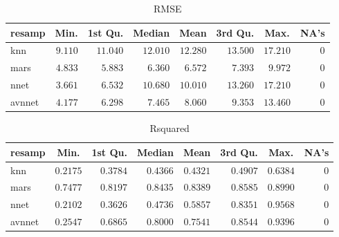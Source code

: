\begin{table}[!tbp]
\caption{RMSE\label{RMSE}} 
\begin{center}
\begin{tabular}{lrrrrrrr}
\hline\hline
\multicolumn{1}{l}{resamp}&\multicolumn{1}{c}{Min.}&\multicolumn{1}{c}{1st Qu.}&\multicolumn{1}{c}{Median}&\multicolumn{1}{c}{Mean}&\multicolumn{1}{c}{3rd Qu.}&\multicolumn{1}{c}{Max.}&\multicolumn{1}{c}{NA's}\tabularnewline
\hline
knn&$9.110$&$11.040$&$12.010$&$12.280$&$13.500$&$17.210$&$0$\tabularnewline
mars&$4.833$&$ 5.883$&$ 6.360$&$ 6.572$&$ 7.393$&$ 9.972$&$0$\tabularnewline
nnet&$3.661$&$ 6.532$&$10.680$&$10.010$&$13.260$&$17.210$&$0$\tabularnewline
avnnet&$4.177$&$ 6.298$&$ 7.465$&$ 8.060$&$ 9.353$&$13.460$&$0$\tabularnewline
\hline
\end{tabular}\end{center}

\end{table}
\begin{table}[!tbp]
\caption{Rsquared\label{Rsquared}} 
\begin{center}
\begin{tabular}{lrrrrrrr}
\hline\hline
\multicolumn{1}{l}{resamp}&\multicolumn{1}{c}{Min.}&\multicolumn{1}{c}{1st Qu.}&\multicolumn{1}{c}{Median}&\multicolumn{1}{c}{Mean}&\multicolumn{1}{c}{3rd Qu.}&\multicolumn{1}{c}{Max.}&\multicolumn{1}{c}{NA's}\tabularnewline
\hline
knn&$0.2175$&$0.3784$&$0.4366$&$0.4321$&$0.4907$&$0.6384$&$0$\tabularnewline
mars&$0.7477$&$0.8197$&$0.8435$&$0.8389$&$0.8585$&$0.8990$&$0$\tabularnewline
nnet&$0.2102$&$0.3626$&$0.4736$&$0.5857$&$0.8351$&$0.9568$&$0$\tabularnewline
avnnet&$0.2547$&$0.6865$&$0.8000$&$0.7541$&$0.8544$&$0.9396$&$0$\tabularnewline
\hline
\end{tabular}\end{center}

\end{table}
